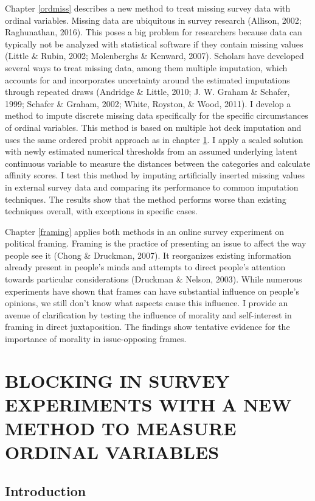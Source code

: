\documentclass[12pt,econ]{sources/authesis}
\begin{document}
Chapter \ref{ordmiss} describes a new method to treat missing survey data with ordinal variables. Missing data are ubiquitous in survey research (Allison, 2002; Raghunathan, 2016). This poses a big problem for researchers because data can typically not be analyzed with statistical software if they contain missing values (Little \& Rubin, 2002; Molenberghs \& Kenward, 2007). Scholars have developed several ways to treat missing data, among them multiple imputation, which accounts for and incorporates uncertainty around the estimated imputations through repeated draws (Andridge \& Little, 2010; J. W. Graham \& Schafer, 1999; Schafer \& Graham, 2002; White, Royston, \& Wood, 2011). I develop a method to impute discrete missing data specifically for the specific circumstances of ordinal variables. This method is based on multiple hot deck imputation and uses the same ordered probit approach as in chapter \ref{ordblock}. I apply a scaled solution with newly estimated numerical thresholds from an assumed underlying latent continuous variable to measure the distances between the categories and calculate affinity scores. I test this method by imputing artificially inserted missing values in external survey data and comparing its performance to common imputation techniques. The results show that the method performs worse than existing techniques overall, with exceptions in specific cases.

Chapter \ref{framing} applies both methods in an online survey experiment on political framing. Framing is the practice of presenting an issue to affect the way people see it (Chong \& Druckman, 2007). It reorganizes existing information already present in people's minds and attempts to direct people's attention towards particular considerations (Druckman \& Nelson, 2003). While numerous experiments have shown that frames can have substantial influence on people's opinions, we still don't know what aspects cause this influence. I provide an avenue of clarification by testing the influence of morality and self-interest in framing in direct juxtaposition. The findings show tentative evidence for the importance of morality in issue-opposing frames.

\hypertarget{ordblock}{%
\chapter{BLOCKING IN SURVEY EXPERIMENTS WITH A NEW METHOD TO MEASURE ORDINAL VARIABLES}\label{ordblock}}

\hypertarget{ordblock-intro}{%
\section{Introduction}\label{ordblock-intro}}
\end{document}
